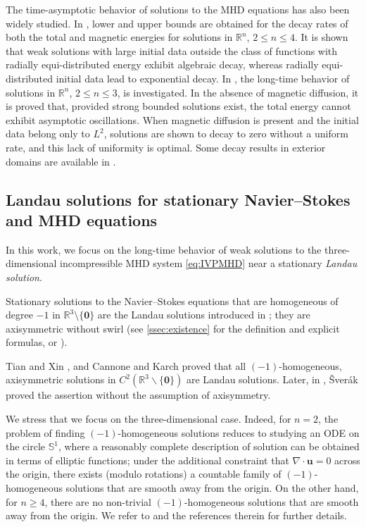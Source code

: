 \documentclass[10pt]{amsart}
\theoremstyle{plain}
\theoremstyle{definition}
\theoremstyle{remark}
\numberwithin{equation}{section}
\begin{document}
The time-asymptotic behavior of solutions to the MHD equations has also been widely studied. In \cite{SSS1996}, lower and upper bounds are obtained for the decay rates of both the total and magnetic energies for solutions in $\mathbb{R}^n$, $2 \le n \le 4$. It is shown that weak solutions with large initial data outside the class of functions with radially equi-distributed energy exhibit algebraic decay, whereas radially equi-distributed initial data lead to exponential decay. In \cite{AgapitoSchonbek2007}, the long-time behavior of solutions in  $\mathbb{R}^n$, $2 \le n \le 3$, is investigated. In the absence of magnetic diffusion, it is proved that, provided strong bounded solutions exist, the total energy cannot exhibit asymptotic oscillations. When magnetic diffusion is present and the initial data belong only to $L^2$, solutions are shown to decay to zero without a uniform rate, and this lack of uniformity is optimal. Some decay results in exterior domains are available in \cite{MR894160}.


\subsection{Landau solutions for stationary Navier--Stokes and MHD equations}

In this work, we focus on the long-time behavior of weak solutions to the three-dimensional incompressible MHD system \cref{eq:IVPMHD} near a stationary \textit{Landau solution}.

Stationary solutions to the Navier--Stokes equations that are homogeneous of degree $-1$ in $\mathbb{R}^3\setminus\{\mathbf0\}$ are the Landau solutions introduced in \cite{Landau1944}; they are axisymmetric without swirl (see \cref{ssec:existence} for the definition and explicit formulas, or \cite[Section 8.2]{Tsai2018}).


Tian and Xin \cite{TianXin1998}, and Cannone and Karch \cite{CannoneKarch2004} proved that all $(-1)$-homogeneous, axisymmetric solutions in $C^2\left(\mathbb{R}^3 \backslash\{\mathbf0\}\right)$ are Landau solutions.  Later, in \cite{Sverak2011}, \v{S}ver\'{a}k proved the assertion without the assumption of axisymmetry. 

We stress that we focus on the three-dimensional case. Indeed, for $n = 2$, the problem of finding  $(-1)$-homogeneous solutions reduces to studying an ODE on the circle $\mathbb S^1$, where a reasonably complete description of solution can be obtained in terms of elliptic functions; under the additional constraint that $\nabla \cdot \boldsymbol{u} = 0$ across the origin, there exists (modulo rotations) a countable family of $(-1)$-homogeneous solutions that are smooth away from the origin. On the other hand, for $n \ge 4$, there are no non-trivial $(-1)$-homogeneous solutions that are smooth away from the origin. We refer to \cite{Sverak2011} and the references therein for further details.
\end{document}
